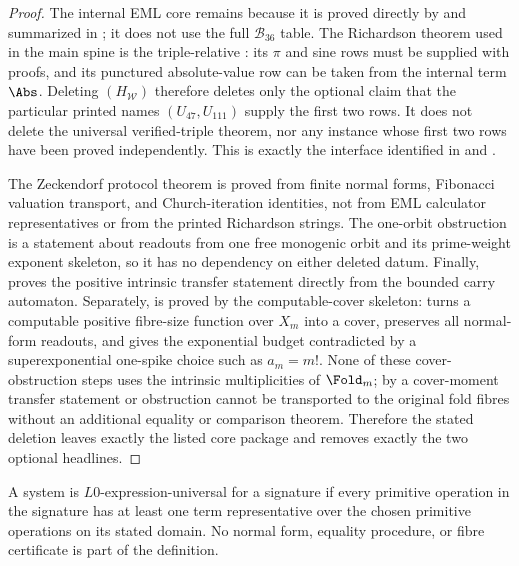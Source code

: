 \begin{proof}
The internal EML core remains because it is proved directly by
 and summarized in
; it does not use the full
\(\mathcal B_{36}\) table.  The Richardson theorem used in the main spine is the
triple-relative : its \(\pi\) and sine rows must be supplied
with proofs, and its punctured absolute-value row can be taken from the internal
term \(\Abs\).  Deleting \((H_{\mathcal W})\) therefore deletes only the optional
claim that the particular printed names \((U_{47},U_{111})\) supply the first two
rows.  It does not delete the universal verified-triple theorem, nor any instance
whose first two rows have been proved independently.  This is exactly the
interface identified in  and
.

The Zeckendorf protocol theorem  is proved from
finite normal forms, Fibonacci valuation transport, and Church-iteration
identities, not from EML calculator representatives or from the printed
Richardson strings.  The one-orbit obstruction 
is a statement about readouts from one free monogenic orbit and its prime-weight
exponent skeleton, so it has no dependency on either deleted datum.  Finally,
 proves the positive intrinsic transfer
statement directly from the bounded carry automaton.  Separately,
 is proved by the computable-cover skeleton:
 turns a computable positive fibre-size
function over \(X_m\) into a cover,  preserves
all normal-form readouts, and  gives
the exponential budget contradicted by a superexponential one-spike choice such
as \(a_m=m!\).  None of these cover-obstruction steps uses the intrinsic
multiplicities of \(\Fold_m\); by  a
cover-moment transfer statement or obstruction cannot be transported to the
original fold fibres without an additional equality or comparison theorem.
Therefore the stated deletion leaves
exactly the listed core package and removes exactly the two optional headlines.
\end{proof}

\begin{definition}\label{def:expr-univ}
A system is \(L0\)-expression-universal for a signature if every primitive
operation in the signature has at least one term representative over the chosen
primitive operations on its stated domain.  No normal form, equality procedure,
or fibre certificate is part of the definition.
\end{definition}

